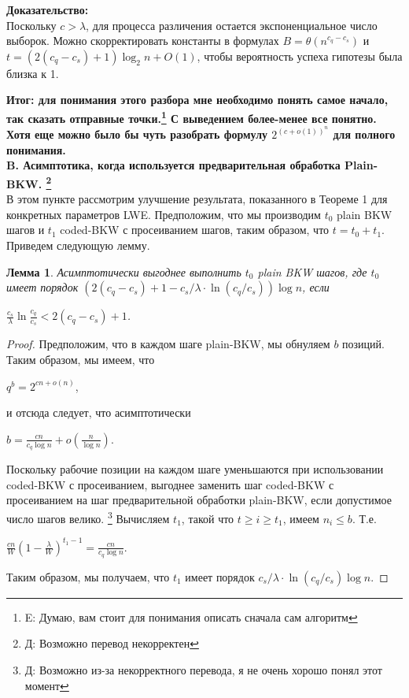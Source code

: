 \documentclass[a4paper,11pt]{article}
\newtheorem{lemma}[theorem]{Лемма}
\begin{document}
\textbf{Доказательство:}\\
Поскольку $c> \lambda$, для процесса различения остается экспоненциальное число выборок. Можно скорректировать константы в формулах $B=\theta(n^{c_q-c_s})$ и $t=(2(c_q-c_s)+1)\log_2 n + O(1)$, чтобы вероятность успеха гипотезы была близка к 1.

\textbf{Итог: для понимания этого разбора мне необходимо понять самое начало, так сказать отправные точки.\footnote{E: Думаю, вам стоит для понимания описать сначала сам алгоритм} С выведением более-менее все понятно. Хотя еще можно было бы чуть разобрать формулу $2^{(c+o(1))^n}$ для полного понимания.}\\

\textbf {B. Асимптотика, когда используется предварительная обработка Plain-BKW. \footnote{Д: Возможно перевод некорректен}}\\

В этом пункте рассмотрим улучшение результата, показанного в Теореме 1 для конкретных параметров LWE. Предположим, что мы производим $t_0$ plain BKW шагов и $t_1$ coded-BKW с просеиванием шагов, таким образом, что $t=t_0+t_1$. Приведем следующую лемму.

\begin{lemma}
Асимптотически выгоднее выполнить $t_0$ plain BKW шагов, где $t_0$ имеет порядок $(2(c_q - c_s)+1-c_s/\lambda \cdot \ln{(c_q/c_s)}) \log{n}$, если\\
\begin{center}
$\frac{c_s}{\lambda}\ln{\frac{c_q}{c_s}} < 2(c_q - c_s) + 1$.
\end{center}
\end{lemma}

\begin{center}
\end{center}

\begin{proof}
Предположим, что в каждом шаге plain-BKW, мы обнуляем $b$ позиций. Таким образом, мы имеем, что
\begin{center}
$q^b=2^{cn + o(n)}$, 
\end{center}
и отсюда следует, что асимптотически
\begin{center}
$b = \frac{cn}{c_q\log{n}} + o(\frac{n}{\log{n}})$.
\end{center}

Поскольку рабочие позиции на каждом шаге уменьшаются при использовании coded-BKW с просеиванием, выгоднее заменить шаг coded-BKW с просеиванием на шаг предварительной обработки plain-BKW, если допустимое число шагов велико. \footnote{Д: Возможно из-за некорректного перевода, я не очень хорошо понял этот момент} Вычисляем $t_1$, такой что $t \geq i \geq t_1$, имеем $n_i \leq b$. Т.е.
\begin{center}
$\frac{cn}{W}(1 - \frac{\lambda}{W})^{t_1 - 1} = \frac{cn}{c_q\log{n}}$.
\end{center}
Таким образом, мы получаем, что $t_1$ имеет порядок $c_s/\lambda \cdot \ln{(c_q/c_s)} \log{n}$.
\end{proof}
\end{document}
